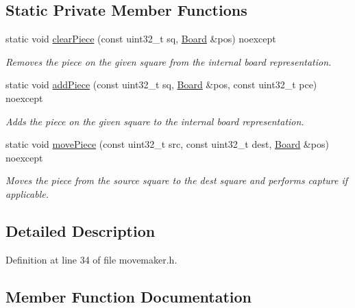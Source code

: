 \subsection*{Static Private Member Functions}
\begin{DoxyCompactItemize}
\item 
static void \mbox{\hyperlink{classMM_a590ca1cb1afc08df645f947e48c13e0c}{clear\+Piece}} (const uint32\+\_\+t sq, \mbox{\hyperlink{classBoard}{Board}} \&pos) noexcept
\begin{DoxyCompactList}\small\item\em Removes the piece on the given square from the internal board representation. \end{DoxyCompactList}\item 
static void \mbox{\hyperlink{classMM_a2f50160abe49fcba984c0db8cca3a2e4}{add\+Piece}} (const uint32\+\_\+t sq, \mbox{\hyperlink{classBoard}{Board}} \&pos, const uint32\+\_\+t pce) noexcept
\begin{DoxyCompactList}\small\item\em Adds the piece on the given square to the internal board representation. \end{DoxyCompactList}\item 
static void \mbox{\hyperlink{classMM_a0a47ca15cd28a2b8136e7be86aff84e7}{move\+Piece}} (const uint32\+\_\+t src, const uint32\+\_\+t dest, \mbox{\hyperlink{classBoard}{Board}} \&pos) noexcept
\begin{DoxyCompactList}\small\item\em Moves the piece from the source square to the dest square and performs capture if applicable. \end{DoxyCompactList}\end{DoxyCompactItemize}


\subsection{Detailed Description}


Definition at line 34 of file movemaker.\+h.



\subsection{Member Function Documentation}
\mbox{\label{classMM_a2f50160abe49fcba984c0db8cca3a2e4}} 
